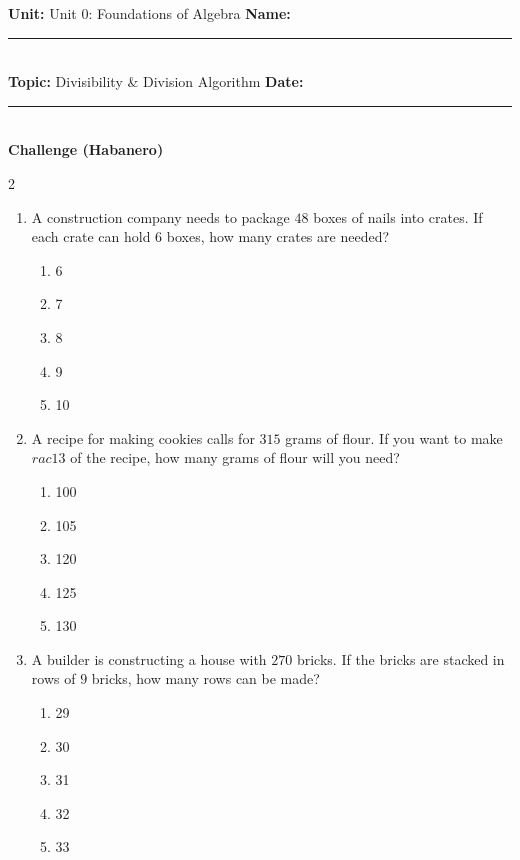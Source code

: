 \documentclass[10pt]{article}
\begin{document}
\enlargethispage{2.5cm}

\begin{tcolorbox}[colback=mainblue!5, colframe=mainblue, sharp corners, boxrule=0.5pt]
    \small \textbf{Unit:} Unit 0: Foundations of Algebra \hfill \textbf{Name:} \rule{3cm}{0.4pt} \\
    \small \textbf{Topic:} Divisibility & Division Algorithm \hfill \textbf{Date:} \rule{2cm}{0.4pt} \\
    \centering \textbf{\large Challenge (Habanero)}
\end{tcolorbox}

\vspace{0.2cm}

\begin{multicols}{2}
\begin{enumerate}[label=\textbf{Q\arabic*.}, leftmargin=*, itemsep=6pt, parsep=0pt]

  \item \small A construction company needs to package $48$ boxes of nails into crates. If each crate can hold $6$ boxes, how many crates are needed?
  \begin{enumerate}[label=(\Alph*), leftmargin=0.6cm, nosep, itemsep=2pt]
    \item 6
    \item 7
    \item 8
    \item 9
    \item 10
  \end{enumerate}

  \item \small A recipe for making cookies calls for $315$ grams of flour. If you want to make $rac{1}{3}$ of the recipe, how many grams of flour will you need?
  \begin{enumerate}[label=(\Alph*), leftmargin=0.6cm, nosep, itemsep=2pt]
    \item 100
    \item 105
    \item 120
    \item 125
    \item 130
  \end{enumerate}

  \item \small A builder is constructing a house with $270$ bricks. If the bricks are stacked in rows of $9$ bricks, how many rows can be made?
  \begin{enumerate}[label=(\Alph*), leftmargin=0.6cm, nosep, itemsep=2pt]
    \item 29
    \item 30
    \item 31
    \item 32
    \item 33
  \end{enumerate}


\end{enumerate}
\end{multicols}
\end{document}
